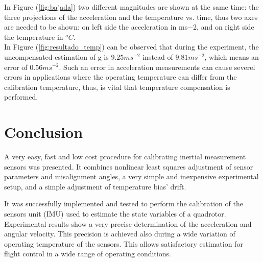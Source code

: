 \documentclass[conference]{IEEEtran}
\newcommand{\refp}[1]{(\ref{#1})}
\begin{document}
In Figure \refp{fig:bajada} two different magnitudes
are shown at the same time: the three projections of the acceleration and the
temperature vs. time, thus two axes are needed to be shown: on left side
the acceleration in ms−2, and on right side the temperature in
$^oC$.\\

In Figure \refp{fig:resultado_temp} can be observed that during
the experiment, the uncompensated estimation of g is $9.25ms^{-2}$ instead of
$9.81ms^{-2}$, which means an error of $0.56ms^{-2}$. Such an
error in acceleration measurements can cause severel errors
in applications where the operating temperature can differ
from the calibration temperature, thus, is vital that temperature
compensation is performed.


\section{Conclusion}
A very easy, fast and low cost procedure for calibrating inertial measurement sensors was 
presented. It combines nonlinear least squares adjustment of sensor parameters and misalignment 
angles, a very simple and inexpensive experimental setup, and a simple adjustment of temperature bias' drift.

It was successfully implemented and tested to perform the calibration of the sensors unit (IMU) 
used to estimate the state variables of a quadrotor. Experimental results show a very precise determination of the acceleration and angular velocity. This precision is achieved also during a wide variation of operating temperature of the sensors. This allows satisfactory estimation for flight control in a wide range of operating conditions.




%
%
 



\end{document}

